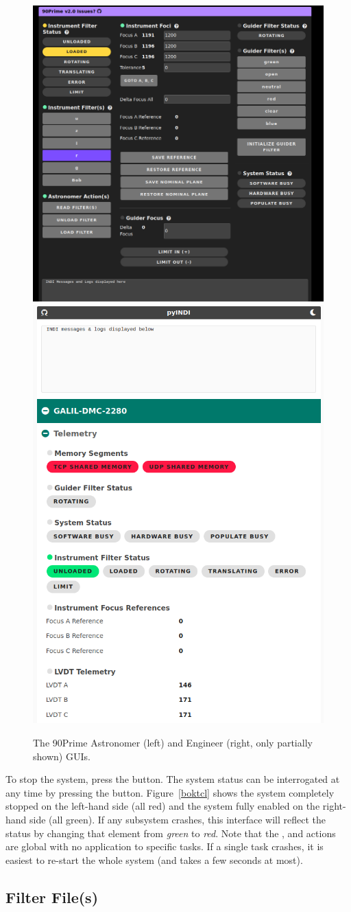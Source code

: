 \documentclass[12pt,twoside]{article}
\begin{document}
\begin{figure}[!h]
 \centering
 \includegraphics[width=0.5\linewidth]{AstronomerGUI.png}
 \includegraphics[width=0.4\linewidth]{EngineerGUI.png}
 \caption{The 90Prime Astronomer (left) and Engineer (right, only partially shown) GUIs.}
 \label{bokgui}
\end{figure}

\noindent To stop the system, press the  button. The system status can be interrogated at any time by pressing 
the  button. Figure~\ref{boktcl} shows the system completely stopped on the left-hand side (all red) and
the system fully enabled on the right-hand side (all green). If any subsystem crashes, this interface will reflect the status
by changing that element from \emph{green} to \emph{red}. Note that the ,  and  
actions are global with no application to specific tasks. If a single task crashes, it is easiest to re-start the whole system
(and takes a few seconds at most).

\subsection{Filter File(s)}
\label{filterfiles}
\end{document}
